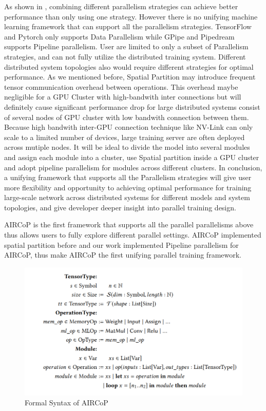 \documentclass[sigplan]{acmart}\settopmatter{printfolios=true,printccs=false,printacmref=false}
\begin{document}
 As shown in \cite{krizhevsky2014one}, combining different parallelism strategies can achieve better performance than only using one strategy. However there is no unifying machine learning framework that can support all the parallelism strategies. TensorFlow\cite{abadi2016tensorflow} and Pytorch\cite{paszke2019pytorch} only supports Data Parallelism while GPipe\cite{huang2019gpipe} and Pipedream\cite{narayanan2019pipedream} supports Pipeline parallelism. User are limited to only a subset of Parallelism strategies, and can not fully utilize the distributed training system. Different distributed system topologies also would require different strategies for optimal performance. As we mentioned before, Spatial Partition may introduce frequent tensor communication overhead between operations. This overhead maybe negligible for a GPU Cluster with high-bandwith inter connections but will definitely cause significant performance drop for large distributed systems consist of several nodes of GPU cluster with low bandwith connection between them. Because high bandwith inter-GPU connection technique like NV-Link can only scale to a limited number of devices, large training server are often deployed across mutiple nodes. It will be ideal to divide the model into several modules and assign each module into a cluster, use Spatial partition inside a GPU cluster and adopt pipeline parallelism for modules across different clusters. In conclusion, a unifying framework that supports all the Parallelism strategies will give user more flexibility and opportunity to achieving optimal performance for training large-scale network across distributed systems for different models and system topologies, and give developer deeper insight into parallel training design.\par
 AIRCoP \cite{aircopfeiwang} is the first framework that supports all the parallel parallelisms above thus allows users to fully explore different parallel settings. AIRCoP implemented spatial partition before and our work implemented Pipeline parallelism for AIRCoP, thus make AIRCoP the first unifying parallel training framework.\par
 \begin{figure}[htbp]
  \centering
  \includegraphics[scale=0.7]{FormalSyntax}
  \caption{Formal Syntax of AIRCoP}
  \label{fig:sample}
\end{figure}
\end{document}
